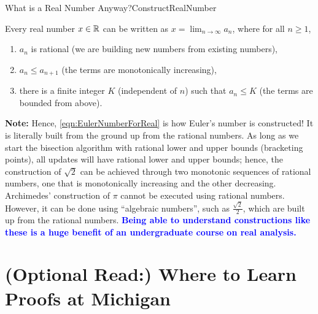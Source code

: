 \begin{funColor}{What is a Real Number Anyway?}{ConstructRealNumber}

Every real number $x\in \mathbb R$ can be written as $x = \displaystyle \lim_{n \to \infty} a_n$, where for all $n\ge 1$,
\begin{enumerate}
    \item  $a_n$ is rational (we are building new numbers from existing numbers),
    
   \item $a_{n} \le a_{n+1}$ (the terms are monotonically increasing), 
      
      \item there is a finite integer $K$ (independent of $n$) such that  $a_n \le K$  (the terms are bounded from above).
\end{enumerate}  

\bigskip
\textbf{Note:} Hence, \eqref{eqn:EulerNumberForReal} is how Euler's number is constructed! It is literally built from the ground up from the rational numbers. As long as we start the bisection algorithm with rational lower and upper bounds (bracketing points), all updates will have rational lower and upper bounds; hence, the construction of $\sqrt{2}$ can be achieved through two monotonic sequences of rational numbers, one that is monotonically increasing and the other decreasing. Archimedes' construction of $\pi$ cannot be executed using rational numbers. However, it can be done using ``algebraic numbers'', such as $\frac{\sqrt{2}}{2}$, which are built up from the rational numbers. \textcolor{blue}{\bf Being able to understand constructions like these is a huge benefit of an undergraduate course on real analysis.} 
\end{funColor}

\section{(Optional Read:) Where to Learn Proofs at Michigan}
\label{sec:ProofsMichiganChap02}

\bigskip

